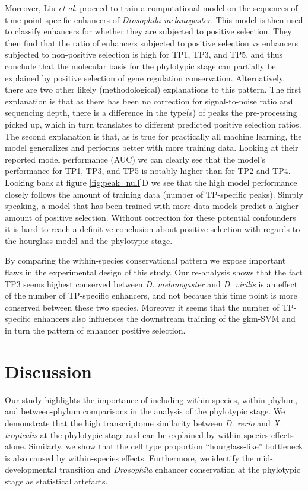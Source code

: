 Moreover, Liu \textit{et al.} proceed to train a computational model on the sequences of time-point specific enhancers of \textit{Drosophila melanogaster}. This model is then used to classify enhancers for whether they are subjected to positive selection. They then find that the ratio of enhancers subjected to positive selection vs enhancers subjected to non-positive selection is high for TP1, TP3, and TP5, and thus conclude that the molecular basis for the phylotypic stage can partially be explained by positive selection of gene regulation conservation. Alternatively, there are two other likely (methodological) explanations to this pattern. The first explanation is that as there has been no correction for signal-to-noise ratio and sequencing depth, there is a difference in the type(s) of peaks the pre-processing picked up, which in turn translates to different predicted positive selection ratios. The second explanation is that, as is true for practically all machine learning, the model generalizes and performs better with more training data. Looking at their reported model performance (AUC) we can clearly see that the model's performance for TP1, TP3, and TP5 is notably higher than for TP2 and TP4. Looking back at figure \ref{fig:peak_null}D we see that the high model performance closely follows the amount of training data (number of TP-specific peaks). Simply speaking, a model that has been trained with more data models predict a higher amount of positive selection. Without correction for these potential confounders it is hard to reach a definitive conclusion about positive selection with regards to the hourglass model and the phylotypic stage.

By comparing the within-species conservational pattern we expose important flaws in the experimental design of this study. Our re-analysis shows that the fact TP3 seems highest conserved between \textit{D. melanogaster} and \textit{D. virilis} is an effect of the number of TP-specific enhancers, and not because this time point is more conserved between these two species. Moreover it seems that the number of TP-specific enhancers also influences the downstream training of the gkm-SVM and in turn the pattern of enhancer positive selection. 

\section{Discussion}

Our study highlights the importance of including within-species, within-phylum, and between-phylum comparisons in the analysis of the phylotypic stage. We demonstrate that the high transcriptome similarity between \textit{D. rerio} and \textit{X. tropicalis} at the phylotypic stage and can be explained by within-species effects alone. Similarly, we show that the cell type proportion ``hourglass-like'' bottleneck is also caused by within-species effects. Furthermore, we identify the mid-developmental transition and \textit{Drosophila} enhancer conservation at the phylotypic stage as statistical artefacts. 

